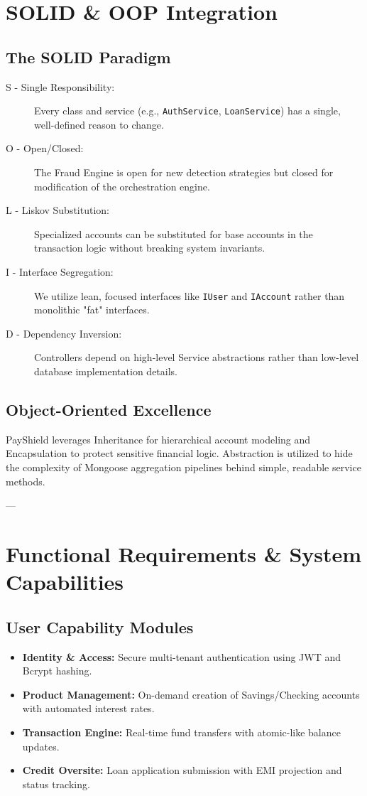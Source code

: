 \documentclass[11pt,a4paper]{article}
\begin{document}
\section{SOLID \& OOP Integration}

\subsection{The SOLID Paradigm}
\begin{description}
    \item[S - Single Responsibility:] Every class and service (e.g., \texttt{AuthService}, \texttt{LoanService}) has a single, well-defined reason to change.
    \item[O - Open/Closed:] The Fraud Engine is open for new detection strategies but closed for modification of the orchestration engine.
    \item[L - Liskov Substitution:] Specialized accounts can be substituted for base accounts in the transaction logic without breaking system invariants.
    \item[I - Interface Segregation:] We utilize lean, focused interfaces like \texttt{IUser} and \texttt{IAccount} rather than monolithic "fat" interfaces.
    \item[D - Dependency Inversion:] Controllers depend on high-level Service abstractions rather than low-level database implementation details.
\end{description}

\subsection{Object-Oriented Excellence}
PayShield leverages Inheritance for hierarchical account modeling and Encapsulation to protect sensitive financial logic. Abstraction is utilized to hide the complexity of Mongoose aggregation pipelines behind simple, readable service methods.

---

\section{Functional Requirements \& System Capabilities}

\subsection{User Capability Modules}
\begin{itemize}
    \item \textbf{Identity \& Access:} Secure multi-tenant authentication using JWT and Bcrypt hashing.
    \item \textbf{Product Management:} On-demand creation of Savings/Checking accounts with automated interest rates.
    \item \textbf{Transaction Engine:} Real-time fund transfers with atomic-like balance updates.
    \item \textbf{Credit Oversite:} Loan application submission with EMI projection and status tracking.
\end{itemize}
\end{document}
